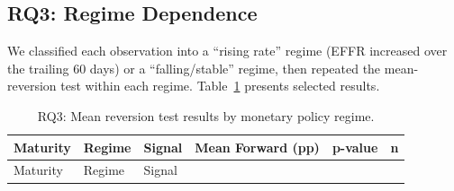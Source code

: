 \documentclass[
  11pt,
  letterpaper,
  DIV=11,
  numbers=noendperiod]{scrartcl}
\begin{document}
\subsection{RQ3: Regime Dependence}\label{rq3-regime-dependence}

We classified each observation into a ``rising rate'' regime (EFFR
increased over the trailing 60 days) or a ``falling/stable'' regime,
then repeated the mean-reversion test within each regime.
Table~\ref{tbl-rq3} presents selected results.

\begin{longtable}[]{@{}
  >{\raggedright\arraybackslash}p{}
  >{\raggedright\arraybackslash}p{}
  >{\raggedright\arraybackslash}p{}
  >{\raggedleft\arraybackslash}p{}
  >{\raggedleft\arraybackslash}p{}
  >{\raggedleft\arraybackslash}p{}@{}}
\caption{RQ3: Mean reversion test results by monetary policy
regime.}\label{tbl-rq3}\tabularnewline
\toprule\noalign{}
\begin{minipage}[b]{\linewidth}\raggedright
Maturity
\end{minipage} & \begin{minipage}[b]{\linewidth}\raggedright
Regime
\end{minipage} & \begin{minipage}[b]{\linewidth}\raggedright
Signal
\end{minipage} & \begin{minipage}[b]{\linewidth}\raggedleft
Mean Forward (pp)
\end{minipage} & \begin{minipage}[b]{\linewidth}\raggedleft
p-value
\end{minipage} & \begin{minipage}[b]{\linewidth}\raggedleft
n
\end{minipage} \\
\midrule\noalign{}
\endfirsthead
\toprule\noalign{}
\begin{minipage}[b]{\linewidth}\raggedright
Maturity
\end{minipage} & \begin{minipage}[b]{\linewidth}\raggedright
Regime
\end{minipage} & \begin{minipage}[b]{\linewidth}\raggedright
Signal
\end{minipage} & \begin{minipage}[b]{\linewidth}\raggedleft

\end{minipage}
\end{longtable}
\end{document}
